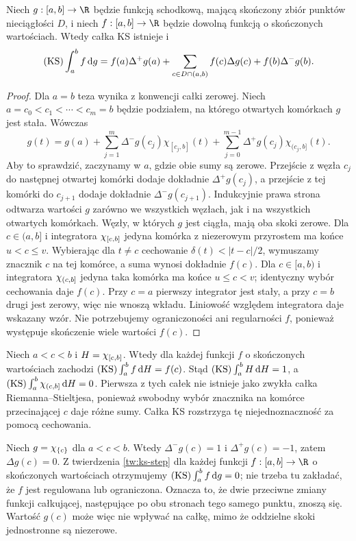 \begin{twierdzenie}
\label{tw:ks-step}
Niech $g:[a,b]\to\R$ będzie funkcją schodkową, mającą skończony zbiór punktów nieciągłości $D$, i niech $f:[a,b]\to\R$ będzie dowolną funkcją o skończonych wartościach. Wtedy całka KS istnieje i
\[
 (\mathrm{KS})\int_a^b f\,\mathrm dg
 =f(a)\Delta^+g(a)+\sum_{c\in D\cap(a,b)}f(c)\Delta g(c)+f(b)\Delta^-g(b).
\]
\end{twierdzenie}
\begin{proof}
Dla $a=b$ teza wynika z konwencji całki zerowej. Niech $a=c_0<c_1<\cdots<c_m=b$ będzie podziałem, na którego otwartych komórkach $g$ jest stała. Wówczas
\[
 g(t)=g(a)+\sum_{j=1}^m\Delta^-g(c_j)\chi_{[c_j,b]}(t)
 +\sum_{j=0}^{m-1}\Delta^+g(c_j)\chi_{(c_j,b]}(t).
\]
Aby to sprawdzić, zaczynamy w $a$, gdzie obie sumy są zerowe. Przejście z węzła $c_j$ do następnej otwartej komórki dodaje dokładnie $\Delta^+g(c_j)$, a przejście z tej komórki do $c_{j+1}$ dodaje dokładnie $\Delta^-g(c_{j+1})$. Indukcyjnie prawa strona odtwarza wartości $g$ zarówno we wszystkich węzłach, jak i na wszystkich otwartych komórkach. Węzły, w których $g$ jest ciągła, mają oba skoki zerowe. Dla $c\in(a,b]$ i integratora $\chi_{[c,b]}$ jedyna komórka z niezerowym przyrostem ma końce $u<c\le v$. Wybierając dla $t\ne c$ cechowanie $\delta(t)<|t-c|/2$, wymuszamy znacznik $c$ na tej komórce, a suma wynosi dokładnie $f(c)$. Dla $c\in[a,b)$ i integratora $\chi_{(c,b]}$ jedyna taka komórka ma końce $u\le c<v$; identyczny wybór cechowania daje $f(c)$. Przy $c=a$ pierwszy integrator jest stały, a przy $c=b$ drugi jest zerowy, więc nie wnoszą wkładu. Liniowość względem integratora daje wskazany wzór. Nie potrzebujemy ograniczoności ani regularności $f$, ponieważ występuje skończenie wiele wartości $f(c)$.
\end{proof}

\begin{przyklad}
Niech $a<c<b$ i $H=\chi_{[c,b]}$. Wtedy dla każdej funkcji $f$ o skończonych wartościach zachodzi $(\mathrm{KS})\int_a^b f\,\mathrm dH=f(c)$. Stąd $(\mathrm{KS})\int_a^b H\,\mathrm dH=1$, a $(\mathrm{KS})\int_a^b\chi_{(c,b]}\,\mathrm dH=0$. Pierwsza z tych całek nie istnieje jako zwykła całka Riemanna--Stieltjesa, ponieważ swobodny wybór znacznika na komórce przecinającej $c$ daje różne sumy. Całka KS rozstrzyga tę niejednoznaczność za pomocą cechowania.
\end{przyklad}

\begin{przyklad}
Niech $g=\chi_{\{c\}}$ dla $a<c<b$. Wtedy $\Delta^-g(c)=1$ i $\Delta^+g(c)=-1$, zatem $\Delta g(c)=0$. Z twierdzenia \ref{tw:ks-step} dla każdej funkcji
$f:[a,b]\to\R$ o skończonych wartościach otrzymujemy
$(\mathrm{KS})\int_a^b f\,\mathrm dg=0$; nie trzeba tu zakładać, że $f$ jest regulowana
lub ograniczona. Oznacza to, że dwie przeciwne zmiany funkcji całkującej, następujące po obu stronach tego samego punktu, znoszą się. Wartość $g(c)$ może więc nie wpływać na całkę, mimo że oddzielne skoki jednostronne są niezerowe.
\end{przyklad}

